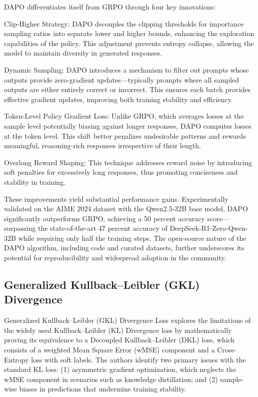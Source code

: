 \documentclass[11pt, oneside]{article}   	%
\begin{document}
DAPO differentiates itself from GRPO through four key innovations:

Clip-Higher Strategy: DAPO decouples the clipping thresholds for importance sampling ratios into separate lower and higher bounds, enhancing the exploration capabilities of the policy. This adjustment prevents entropy collapse, allowing the model to maintain diversity in generated responses.

Dynamic Sampling: DAPO introduces a mechanism to filter out prompts whose outputs provide zero-gradient updates—typically prompts where all sampled outputs are either entirely correct or incorrect. This ensures each batch provides effective gradient updates, improving both training stability and efficiency.

Token-Level Policy Gradient Loss: Unlike GRPO, which averages losses at the sample level potentially biasing against longer responses, DAPO computes losses at the token level. This shift better penalizes undesirable patterns and rewards meaningful, reasoning-rich responses irrespective of their length.

Overlong Reward Shaping: This technique addresses reward noise by introducing soft penalties for excessively long responses, thus promoting conciseness and stability in training.

These improvements yield substantial performance gains. Experimentally validated on the AIME 2024 dataset with the Qwen2.5-32B base model, DAPO significantly outperforms GRPO, achieving a 50 percent accuracy score—surpassing the state-of-the-art 47 percent accuracy of DeepSeek-R1-Zero-Qwen-32B while requiring only half the training steps. The open-source nature of the DAPO algorithm, including code and curated datasets, further underscores its potential for reproducibility and widespread adoption in the community.

\subsection*{Generalized Kullback–Leibler (GKL) Divergence  \cite{cui2025generalizedkullbackleiblerdivergenceloss}}

 Generalized Kullback–Leibler (GKL) Divergence Loss explores the limitations of the widely used Kullback–Leibler (KL) Divergence loss by mathematically proving its equivalence to a Decoupled Kullback–Leibler (DKL) loss, which consists of a weighted Mean Square Error (wMSE) component and a Cross-Entropy loss with soft labels. The authors identify two primary issues with the standard KL loss: (1) asymmetric gradient optimization, which neglects the wMSE component in scenarios such as knowledge distillation; and (2) sample-wise biases in predictions that undermine training stability.
\end{document}
